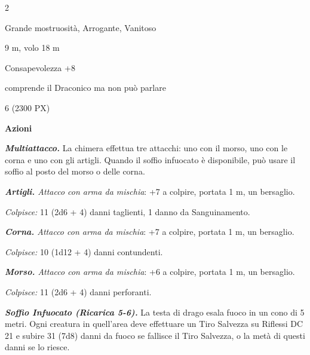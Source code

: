 \begin{multicols}{2}
{
\begin{description}[noitemsep, topsep=0pt, parsep=0pt, partopsep=0pt, itemsep=1pt, leftmargin=2.35cm,  labelwidth=2.2cm, itemindent=0cm, listparindent=0pt] %
\setlength{\baselineskip}{10pt}
\item[\textbf{Taglia/Tipo}] Grande mostruosità, Arrogante, Vanitoso
\item[\textbf{Caratt.}] 
\item[\textbf{Punti Ferita}] 
\item[\textbf{Movimento}] 9 m, volo 18 m
\item[\textbf{Tiri Salvez.}] 
\item[\textbf{Comp.}] Consapevolezza +8
\item[\textbf{Sensi}] 
\item[\textbf{Linguaggi}] comprende il Draconico ma non può parlare
\item[\textbf{Sfida}] 6 (2300 PX)
\end{description}
\smallskip

\textbf{Azioni}

\emph{\textbf{Multiattacco.}} La chimera effettua tre attacchi: uno con il morso, uno con le corna e uno con gli artigli. Quando il soffio infuocato è disponibile, può usare il soffio al posto del morso o delle corna.

\emph{\textbf{Artigli.} Attacco con arma da mischia}: +7 a colpire, portata 1 m, un bersaglio.

\emph{Colpisce:} 11 (2d6 + 4) danni taglienti, 1 danno da Sanguinamento.

\emph{\textbf{Corna.} Attacco con arma da mischia}: +7 a colpire, portata 1 m, un bersaglio.

\emph{Colpisce:} 10 (1d12 + 4) danni contundenti.

\emph{\textbf{Morso.} Attacco con arma da mischia}: +6 a colpire, portata 1 m, un bersaglio.

\emph{Colpisce:} 11 (2d6 + 4) danni perforanti.

\emph{\textbf{Soffio Infuocato (Ricarica 5-6).}} La testa di drago esala fuoco in un cono di 5 metri. Ogni creatura in quell'area deve effettuare un Tiro Salvezza su Riflessi DC 21 e subire 31 (7d8) danni da fuoco se fallisce il Tiro Salvezza, o la metà di questi danni se lo riesce.

}
\end{multicols}
